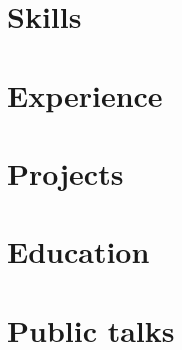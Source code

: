 \documentclass[letter,10pt]{article}
\begin{document}


\section{Skills}


\section{Experience}


\section{Projects}


\section{Education}



\section{Public talks}

\end{document}
